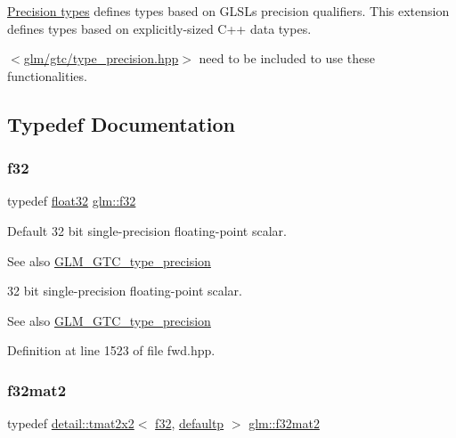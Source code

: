 \hyperlink{group__core__precision}{Precision types} defines types based on G\+L\+SL\textquotesingle{}s precision qualifiers. This extension defines types based on explicitly-\/sized C++ data types.

$<$\hyperlink{type__precision_8hpp}{glm/gtc/type\+\_\+precision.\+hpp}$>$ need to be included to use these functionalities. 

\subsection{Typedef Documentation}
\mbox{\label{group__gtc__type__precision_ga0ec999b57f5330d9021256e96038df04}} 
\subsubsection{\texorpdfstring{f32}{f32}}
{\footnotesize\ttfamily typedef \hyperlink{group__gtc__type__precision_ga814f2f65354b6588b067cc5c67a6b340}{float32} \hyperlink{group__gtc__type__precision_ga0ec999b57f5330d9021256e96038df04}{glm\+::f32}}

Default 32 bit single-\/precision floating-\/point scalar. \begin{DoxySeeAlso}{See also}
\hyperlink{group__gtc__type__precision}{G\+L\+M\+\_\+\+G\+T\+C\+\_\+type\+\_\+precision}
\end{DoxySeeAlso}
32 bit single-\/precision floating-\/point scalar. \begin{DoxySeeAlso}{See also}
\hyperlink{group__gtc__type__precision}{G\+L\+M\+\_\+\+G\+T\+C\+\_\+type\+\_\+precision} 
\end{DoxySeeAlso}


Definition at line 1523 of file fwd.\+hpp.

\mbox{\label{group__gtc__type__precision_ga5a8b82f5ef3eb6355640d57466793d9b}} 
\subsubsection{\texorpdfstring{f32mat2}{f32mat2}}
{\footnotesize\ttfamily typedef \hyperlink{structglm_1_1detail_1_1tmat2x2}{detail\+::tmat2x2}$<$ \hyperlink{group__gtc__type__precision_ga0ec999b57f5330d9021256e96038df04}{f32}, \hyperlink{namespaceglm_a0f04f086094c747d227af4425893f545a9d21ccd8b5a009ec7eb7677befc3bf51}{defaultp} $>$ \hyperlink{group__gtc__type__precision_ga5a8b82f5ef3eb6355640d57466793d9b}{glm\+::f32mat2}}

